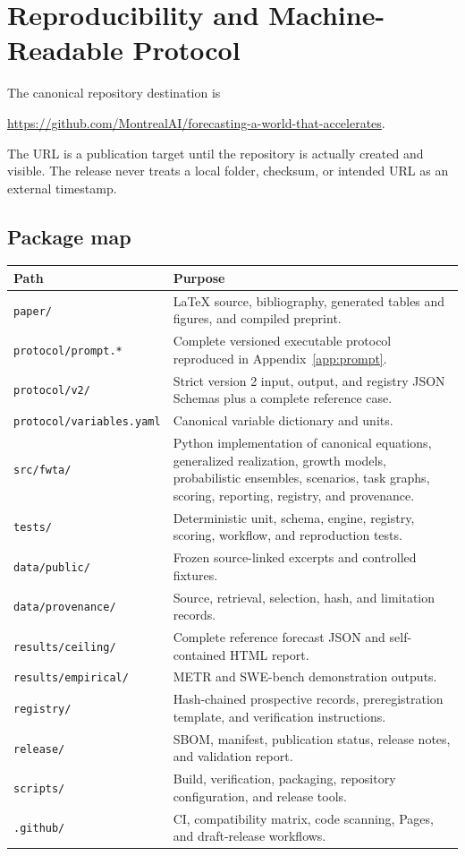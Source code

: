 \section{Reproducibility and Machine-Readable Protocol}
\label{app:reproducibility}

The canonical repository destination is
\begin{center}
\url{https://github.com/MontrealAI/forecasting-a-world-that-accelerates}.
\end{center}
The URL is a publication target until the repository is actually created and visible. The release never treats a local folder, checksum, or intended URL as an external timestamp.

\subsection{Package map}

\begin{longtable}{p{}p{}}
\toprule
\textbf{Path} & \textbf{Purpose}\\
\midrule
\texttt{paper/} & LaTeX source, bibliography, generated tables and figures, and compiled preprint.\\
\texttt{protocol/prompt.*} & Complete versioned executable protocol reproduced in Appendix~\ref{app:prompt}.\\
\texttt{protocol/v2/} & Strict version 2 input, output, and registry JSON Schemas plus a complete reference case.\\
\texttt{protocol/variables.yaml} & Canonical variable dictionary and units.\\
\texttt{src/fwta/} & Python implementation of canonical equations, generalized realization, growth models, probabilistic ensembles, scenarios, task graphs, scoring, reporting, registry, and provenance.\\
\texttt{tests/} & Deterministic unit, schema, engine, registry, scoring, workflow, and reproduction tests.\\
\texttt{data/public/} & Frozen source-linked excerpts and controlled fixtures.\\
\texttt{data/provenance/} & Source, retrieval, selection, hash, and limitation records.\\
\texttt{results/ceiling/} & Complete reference forecast JSON and self-contained HTML report.\\
\texttt{results/empirical/} & METR and SWE-bench demonstration outputs.\\
\texttt{registry/} & Hash-chained prospective records, preregistration template, and verification instructions.\\
\texttt{release/} & SBOM, manifest, publication status, release notes, and validation report.\\
\texttt{scripts/} & Build, verification, packaging, repository configuration, and release tools.\\
\texttt{.github/} & CI, compatibility matrix, code scanning, Pages, and draft-release workflows.\\
\bottomrule
\end{longtable}

